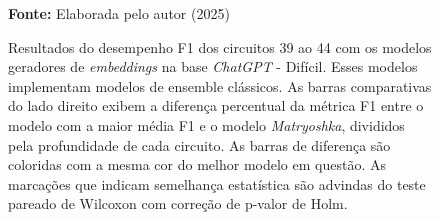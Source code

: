 \begin{figure}
\caption{Resultados do desempenho F1 dos circuitos 39 ao 44 com os modelos geradores de \textit{embeddings} na base \textit{ChatGPT} - Difícil. Esses modelos implementam modelos de ensemble clássicos. As barras comparativas do lado direito exibem a diferença percentual da métrica F1 entre o modelo com a maior média F1 e o modelo \textit{Matryoshka}, divididos pela profundidade de cada circuito. As barras de diferença são coloridas com a mesma cor do melhor modelo em questão. As marcações que indicam semelhança estatística são advindas do teste pareado de Wilcoxon com correção de p-valor de Holm.}
\label{fig:model_transformer:hard:g8}
     \centering
    \centering

      \par\medskip\ABNTEXfontereduzida\selectfont\textbf{Fonte:} Elaborada pelo autor (2025) \par\medskip
\end{figure}